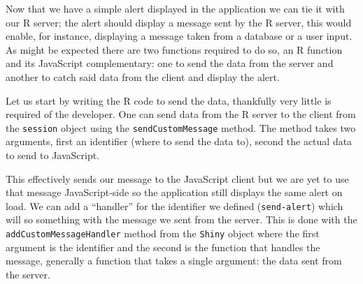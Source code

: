 \documentclass[
]{krantz}
\makeatletter
\newenvironment{Shaded}{\begin{snugshade}}{\end{snugshade}}
\newcommand{\CommentTok}[1]{\textcolor[rgb]{0.37,0.37,0.37}{\textit{#1}}}
\newcommand{\ControlFlowTok}[1]{\textcolor[rgb]{0.27,0.27,0.27}{\textbf{#1}}}
\newcommand{\DataTypeTok}[1]{\textcolor[rgb]{0.27,0.27,0.27}{#1}}
\newcommand{\KeywordTok}[1]{\textcolor[rgb]{0.27,0.27,0.27}{\textbf{#1}}}
\newcommand{\NormalTok}[1]{#1}
\newcommand{\OperatorTok}[1]{\textcolor[rgb]{0.43,0.43,0.43}{\textbf{#1}}}
\newcommand{\StringTok}[1]{\textcolor[rgb]{0.5,0.5,0.5}{#1}}
\newenvironment{kframe}{%
\medskip{}
\setlength{\fboxsep}{.8em}
 \def\at@end@of@kframe{}%
 \ifinner\ifhmode%
  \def\at@end@of@kframe{\end{minipage}}%
  \begin{minipage}{\columnwidth}%
 \fi\fi%
 \def\FrameCommand##1{\hskip\@totalleftmargin \hskip-\fboxsep
 \colorbox{shadecolor}{##1}\hskip-\fboxsep
     \hskip-\linewidth \hskip-\@totalleftmargin \hskip\columnwidth}%
 \MakeFramed {\advance\hsize-\width
   \@totalleftmargin\z@ \linewidth\hsize
   \@setminipage}}%
 {\par\unskip\endMakeFramed%
 \at@end@of@kframe}
\renewenvironment{Shaded}{\begin{kframe}}{\end{kframe}}
\makeatother
\begin{document}
Now that we have a simple alert displayed in the application we can tie it with our R server; the alert should display a message sent by the R server, this would enable, for instance, displaying a message taken from a database or a user input. As might be expected there are two functions required to do so, an R function and its JavaScript complementary: one to send the data from the server and another to catch said data from the client and display the alert.

Let us start by writing the R code to send the data, thankfully very little is required of the developer. One can send data from the R server to the client from the \texttt{session} object using the \texttt{sendCustomMessage} method. The method takes two arguments, first an identifier (where to send the data to), second the actual data to send to JavaScript.

\begin{Shaded}
\end{Shaded}

This effectively sends our message to the JavaScript client but we are yet to use that message JavaScript-side so the application still displays the same alert on load. We can add a ``handler'' for the identifier we defined (\texttt{send-alert}) which will so something with the message we sent from the server. This is done with the \texttt{addCustomMessageHandler} method from the \texttt{Shiny} object where the first argument is the identifier and the second is the function that handles the message, generally a function that takes a single argument: the data sent from the server.

\begin{Shaded}
\end{Shaded}
\end{document}
